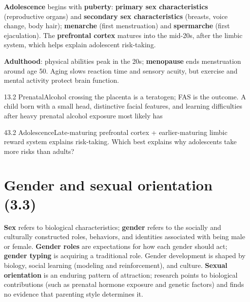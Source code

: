 \documentclass[11pt]{article}
\begin{document}
\textbf{Adolescence} begins with \textbf{puberty}: \textbf{primary sex characteristics} (reproductive organs) and \textbf{secondary sex characteristics} (breasts, voice change, body hair); \textbf{menarche} (first menstruation) and \textbf{spermarche} (first ejaculation). The \textbf{prefrontal cortex} matures into the mid-20s, after the limbic system, which helps explain adolescent risk-taking.

\textbf{Adulthood}: physical abilities peak in the 20s; \textbf{menopause} ends menstruation around age 50. Aging slows reaction time and sensory acuity, but exercise and mental activity protect brain function.

\begin{q}{1}{3.2 Prenatal}{Alcohol crossing the placenta is a teratogen; FAS is the outcome.}
A child born with a small head, distinctive facial features, and learning difficulties after heavy prenatal alcohol exposure most likely has
\end{q}

\begin{q}{4}{3.2 Adolescence}{Late-maturing prefrontal cortex + earlier-maturing limbic reward system explains risk-taking.}
Which best explains why adolescents take more risks than adults?
\end{q}

\section{Gender and sexual orientation (3.3)}

\textbf{Sex} refers to biological characteristics; \textbf{gender} refers to the socially and culturally constructed roles, behaviors, and identities associated with being male or female. \textbf{Gender roles} are expectations for how each gender should act; \textbf{gender typing} is acquiring a traditional role. Gender development is shaped by biology, social learning (modeling and reinforcement), and culture. \textbf{Sexual orientation} is an enduring pattern of attraction; research points to biological contributions (such as prenatal hormone exposure and genetic factors) and finds no evidence that parenting style determines it.
\end{document}
